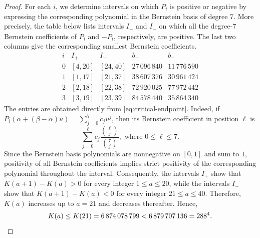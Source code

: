 \documentclass[12pt]{amsart}
\numberwithin{equation}{section}
\theoremstyle{definition}
\theoremstyle{remark}
\numberwithin{equation}{section}
\begin{document}
\begin{proof}
For each $i$, we determine intervals on which $P_i$ is positive or negative by expressing the corresponding polynomial in the Bernstein basis of degree $7$.
 More precisely, the table below lists intervals $I_+$ and $I_-$ on which all the degree-$7$ Bernstein coefficients of $P_i$ and $-P_i$, respectively, are positive.
The last two columns give the corresponding smallest Bernstein coefficients.
	\[
	\begin{array}{c|c|c|r|r}
		i&I_+&I_-&b_+&b_-\\\hline
		0&[4,20]&[24,40]&27\,096\,840&11\,776\,590\\
		1&[1,17]&[21,37]&38\,607\,376&30\,961\,424\\
		2&[2,18]&[22,38]&72\,920\,025&77\,972\,442\\
		3&[3,19]&[23,39]&84\,578\,440&35\,864\,340
	\end{array}
	\]
The entries are obtained directly from \eqref{eq:critical-endpoint}. Indeed, if $P_i(\alpha+(\beta-\alpha)u)=\sum_{j=0}^7c_ju^j$,
	then its Bernstein coefficient in position $\ell$ is
	\[
	\sum_{j=0}^{\ell}c_j\frac{\binom{\ell}{j}}{\binom{7}{j}}, \text{\ where\ } 0\le\ell\le7.
	\]
Since the Bernstein basis polynomials are nonnegative on $[0,1]$ and sum to $1$, positivity of all Bernstein coefficients implies strict positivity of the
	corresponding polynomial throughout the interval. Consequently, the intervals $I_+$ show that $K(a+1)-K(a)>0$ for every integer $1\le a\le20$,
	while the intervals $I_-$ show that $K(a+1)-K(a)<0$ for every integer $21\le a\le40$.
	Therefore, $K(a)$ increases up to $a=21$ and decreases thereafter. Hence, 
\[
	K(a)\le K(21)=6\,874\,078\,799<6\,879\,707\,136=288^4. \qedhere
	\]
\end{proof}
\end{document}
